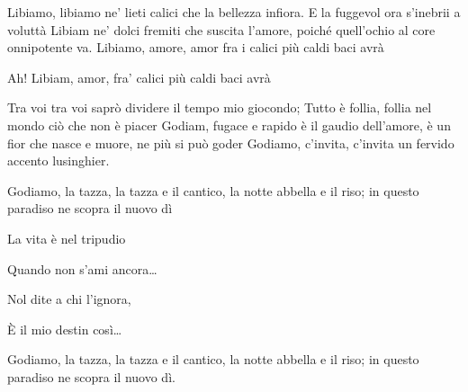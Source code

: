 \medskip

\begin{guitar}
	Libiamo, libiamo ne’ lieti calici
	che la bellezza infiora.
	E la fuggevol ora s’inebrii a voluttà
	Libiam ne’ dolci fremiti
	che suscita l’amore,
	poiché quell’ochio al core onnipotente va.
	Libiamo, amore, amor fra i calici
	più caldi baci avrà

	Ah! Libiam, amor, fra’ calici più caldi baci avrà

	Tra voi tra voi saprò dividere
	il tempo mio giocondo;
	Tutto è follia, follia nel mondo
	ciò che non è piacer
	Godiam, fugace e rapido
	è il gaudio dell’amore,
	è un fior che nasce e muore,
	ne più si può goder
	Godiamo, c’invita, c’invita un fervido
	accento lusinghier.

	Godiamo, la tazza, la tazza e il cantico,
	la notte abbella e il riso;
	in questo paradiso ne scopra il nuovo dì

	 La vita è nel tripudio

	 Quando non s’ami ancora…

	 Nol dite a chi l’ignora,

	 È il mio destin così…

	Godiamo, la tazza, la tazza e il cantico,
	la notte abbella e il riso;
	in questo paradiso ne scopra il nuovo dì.
\end{guitar}
